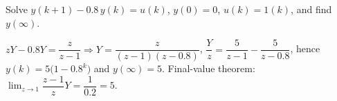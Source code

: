 \begin{problem}
Solve $y(k+1)-0.8\,y(k)=u(k)$, $y(0)=0$, $u(k)=1(k)$, and find $y(\infty)$.
\end{problem}
\begin{solution}
$zY-0.8Y=\dfrac{z}{z-1}\Rightarrow Y=\dfrac{z}{(z-1)(z-0.8)}$, $\dfrac{Y}{z}=\dfrac{5}{z-1}-\dfrac{5}{z-0.8}$, hence
$y(k)=5\bigl(1-0.8^{k}\bigr)$ and $y(\infty)=5$. Final-value theorem: $\lim_{z\to1}\dfrac{z-1}{z}Y=\dfrac{1}{0.2}=5$.
\end{solution}
